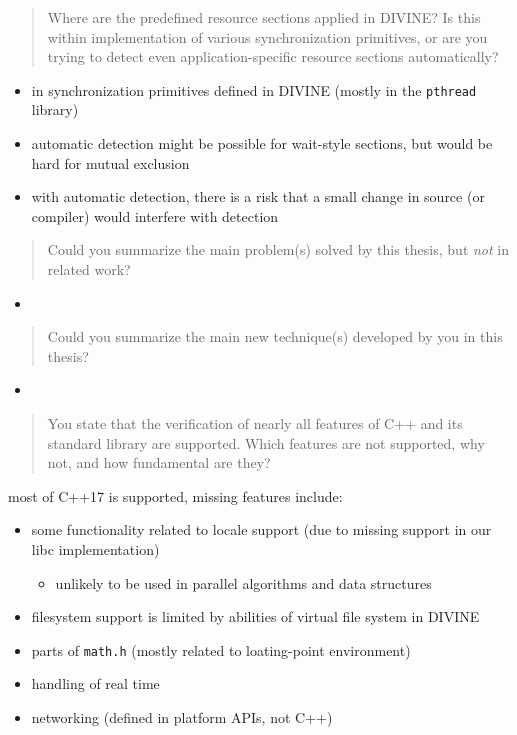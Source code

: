\documentclass[aspectratio=169, fi]{paradise-slide}
\newcommand{\rquote}[1]{\begin{quote}#1\end{quote}\bigskip\setlength{\leftmargini}{1em}}
\begin{document}
\begin{frame}[noframenumbering]{\qtitle}
  \rquote{Where are the predefined resource sections applied in DIVINE? Is this within
    implementation of various synchronization primitives, or are you trying to detect even
    application-specific resource sections automatically?}

  \begin{itemize}
    \item in synchronization primitives defined in DIVINE (mostly in the \texttt{pthread} library)
    \item automatic detection might be possible for wait-style sections, but would be hard for
      mutual exclusion
    \item with automatic detection, there is a risk that a small change in source (or compiler)
      would interfere with detection
  \end{itemize}
\end{frame}

\def\rname{Jaco van de Pol}

\begin{frame}[noframenumbering]{\qtitle}
  \rquote{Could you summarize the main problem(s) solved by this thesis, but \emph{not} in related
    work?}
  \begin{itemize}
    \item 
  \end{itemize}
\end{frame}

\begin{frame}[noframenumbering]{\qtitle}
  \rquote{Could you summarize the main new technique(s) developed by you in this thesis?}
  \begin{itemize}
    \item 
  \end{itemize}
\end{frame}

\begin{frame}[noframenumbering]{\qtitle}
  \rquote{You state that the verification of nearly all features of C++ and its standard library are
    supported. Which features are not supported, why not, and how fundamental are they?}

  most of C++17 is supported, missing features include:
  \begin{itemize}
    \item some functionality related to locale support (due to missing support in our libc
      implementation)
      \begin{itemize}
        \item unlikely to be used in parallel algorithms and data structures
      \end{itemize}
    \item filesystem support is limited by abilities of virtual file system in DIVINE
    \item parts of \texttt{math.h} (mostly related to loating-point environment)
    \item handling of real time
    \item networking (defined in platform APIs, not C++)
  \end{itemize}
\end{frame}
\end{document}
